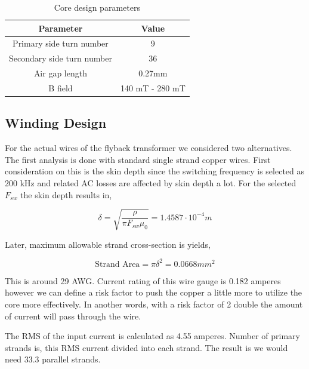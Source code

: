 \documentclass[12pt]{article}
\begin{document}
        \begin{table}[H]
        \centering
        \caption{Core design parameters}
        \begin{tabular}{|c|c|}
        \hline
        \textbf{Parameter}         & \textbf{Value} \\ \hline
        Primary side turn number   & 9              \\ \hline
        Secondary side turn number & 36             \\ \hline
        Air gap length             & 0.27mm         \\ \hline
        B field                    & 140 mT - 280 mT \\ \hline
        \end{tabular}
        \label{tab:core}
        \end{table}

    
    \subsection{Winding Design}
    For the actual wires of the flyback transformer we considered two alternatives. The first analysis is done with standard single strand copper wires. First consideration on this is the skin depth since the switching frequency is selected as 200 kHz and related AC losses are affected by skin depth a lot. For the selected $F_{sw}$ the skin depth results in,

    \begin{equation*}
        \delta = \sqrt{\frac{\rho}{\pi F_{sw} \mu_0 }} = 1.4587\cdot 10^{-4}m
    \end{equation*}

    Later, maximum allowable strand cross-section is yields,
    
    \begin{equation*}
        \textrm{Strand Area} = \pi \delta ^2  = 0.0668 mm^2 
    \end{equation*}

    This is around 29 AWG. Current rating of this wire gauge is 0.182 amperes however we can define a risk factor to push the copper a little more to utilize the core more effectively. In another words, with a risk factor of 2 double the amount of current will pass through the wire.

    The RMS of the input current is calculated as 4.55 amperes.
    Number of primary strands is, this RMS current divided into each strand. The result is we would need 33.3 parallel strands.
\end{document}

